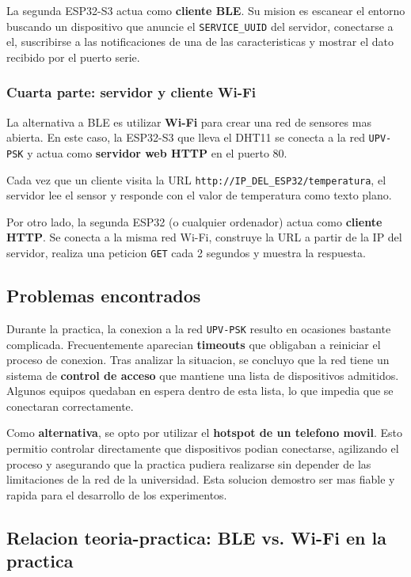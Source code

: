 La segunda ESP32-S3 actua como \textbf{cliente BLE}. Su mision es escanear el entorno
buscando un dispositivo que anuncie el \texttt{SERVICE\_UUID} del servidor, conectarse
a el, suscribirse a las notificaciones de una de las caracteristicas y mostrar el
dato recibido por el puerto serie.

\subsubsection{Cuarta parte: servidor y cliente Wi-Fi}

La alternativa a BLE es utilizar \textbf{Wi-Fi} para crear una red de sensores mas
abierta. En este caso, la ESP32-S3 que lleva el DHT11 se conecta a la red
\texttt{UPV-PSK} y actua como \textbf{servidor web HTTP} en el puerto 80.

Cada vez que un cliente visita la URL \texttt{http://IP\_DEL\_ESP32/temperatura},
el servidor lee el sensor y responde con el valor de temperatura como texto plano.


Por otro lado, la segunda ESP32 (o cualquier ordenador) actua como \textbf{cliente
HTTP}. Se conecta a la misma red Wi-Fi, construye la URL a partir de la IP del
servidor, realiza una peticion \texttt{GET} cada 2 segundos y muestra la respuesta.


\subsection{Problemas encontrados}

Durante la practica, la conexion a la red \texttt{UPV-PSK} resulto en ocasiones
bastante complicada. Frecuentemente aparecian \textbf{timeouts} que obligaban a
reiniciar el proceso de conexion. Tras analizar la situacion, se concluyo que la red
tiene un sistema de \textbf{control de acceso} que mantiene una lista de dispositivos
admitidos. Algunos equipos quedaban en espera dentro de esta lista, lo que impedia
que se conectaran correctamente.

Como \textbf{alternativa}, se opto por utilizar el \textbf{hotspot de un telefono movil}.
Esto permitio controlar directamente que dispositivos podian conectarse, agilizando
el proceso y asegurando que la practica pudiera realizarse sin depender de las
limitaciones de la red de la universidad. Esta solucion demostro ser mas fiable y
rapida para el desarrollo de los experimentos.

\subsection{Relacion teoria-practica: BLE vs. Wi-Fi en la practica}

